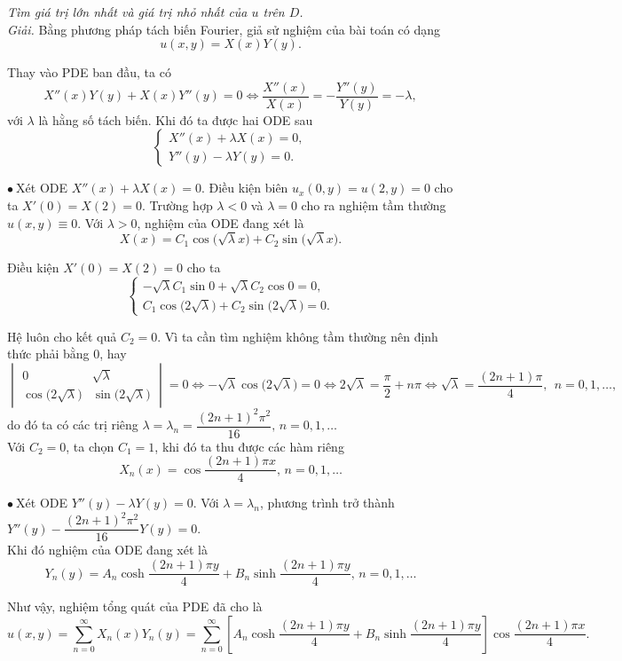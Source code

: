 \documentclass[10pt, a4paper]{article}
\begin{document}
	\textit{Tìm giá trị lớn nhất và giá trị nhỏ nhất của $u$ trên $D$.}\\
	
	\textit{Giải.} Bằng phương pháp tách biến Fourier, giả sử nghiệm của bài toán có dạng $$u(x,y)=X(x)Y(y).$$
	
	Thay vào PDE ban đầu, ta có $$X''(x)Y(y)+X(x)Y''(y)=0\iff\frac{X''(x)}{X(x)}=-\frac{Y''(y)}{Y(y)}=-\lambda,$$
	với $\lambda$ là hằng số tách biến. Khi đó ta được hai ODE sau $$\begin{cases}
		X''(x)+\lambda X(x)=0,\\
		Y''(y)-\lambda Y(y)=0.
	\end{cases}$$
	
	$\bullet~$Xét ODE $X''(x)+\lambda X(x)=0$. Điều kiện biên $u_x(0,y)=u(2,y)=0$ cho ta $X'(0)=X(2)=0$. Trường hợp $\lambda<0$ và $\lambda=0$ cho ra nghiệm tầm thường $u(x,y)\equiv0$. Với $\lambda>0$, nghiệm của ODE đang xét là $$X(x)=C_1\cos\big(\sqrt\lambda x\big)+C_2\sin\big(\sqrt\lambda x\big).$$
	
	Điều kiện $X'(0)=X(2)=0$ cho ta $$\begin{cases}
		-\sqrt\lambda C_1\sin0+\sqrt\lambda C_2\cos0=0,\\
		C_1\cos\big(2\sqrt\lambda\big)+C_2\sin\big(2\sqrt\lambda\big)=0.
	\end{cases}$$
	
	Hệ luôn cho kết quả $C_2=0$. Vì ta cần tìm nghiệm không tầm thường nên định thức phải bằng 0, hay $$\begin{vmatrix}
		0&\sqrt\lambda\\
		\cos\big(2\sqrt\lambda\big)&\sin\big(2\sqrt\lambda\big)
	\end{vmatrix}=0\iff-\sqrt\lambda\cos\big(2\sqrt\lambda\big)=0\iff2\sqrt\lambda=\frac\pi2+n\pi\iff\sqrt\lambda=\frac{(2n+1)\pi}{4},~~n=0,1,\ldots,$$
	do đó ta có các trị riêng $\lambda=\lambda_n=\dfrac{(2n+1)^2\pi^2}{16},\,n=0,1,\ldots$\\
	
	Với $C_2=0$, ta chọn $C_1=1$, khi đó ta thu được các hàm riêng $$X_n(x)=\cos\frac{(2n+1)\pi x}{4},\,n=0,1,\ldots$$
	
	$\bullet~$Xét ODE $Y''(y)-\lambda Y(y)=0$. Với $\lambda=\lambda_n$, phương trình trở thành $Y''(y)-\dfrac{(2n+1)^2\pi^2}{16}Y(y)=0$.\\
	
	Khi đó nghiệm của ODE đang xét là $$Y_n(y)=A_n\cosh\frac{(2n+1)\pi y}{4}+B_n\sinh\frac{(2n+1)\pi y}{4},\,n=0,1,\ldots$$
	
	Như vậy, nghiệm tổng quát của PDE đã cho là $$u(x,y)=\sum_{n=0}^\infty X_n(x)Y_n(y)=\sum_{n=0}^\infty\left[A_n\cosh\frac{(2n+1)\pi y}{4}+B_n\sinh\frac{(2n+1)\pi y}{4}\right]\cos\frac{(2n+1)\pi x}{4}.$$
	
\end{document}
